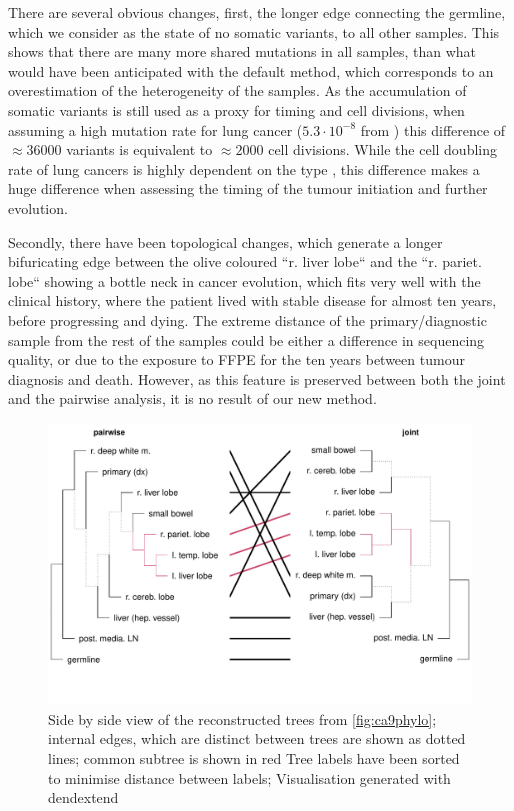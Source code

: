 
There are several obvious changes, first, the longer edge connecting the germline, which we consider as the state of no somatic variants, to all other samples. This shows that there are many more shared mutations in all samples, than what would have been anticipated with the default method, which corresponds to an overestimation of the heterogeneity of the samples. As the accumulation of somatic variants is still used as a proxy for timing and cell divisions, when assuming a high mutation rate for lung cancer ($5.3 \cdot 10^{-8}$ from \citeauthor*{Werner2020} \cite{Werner2020}) this difference of $\approx 36000$ variants is equivalent to $\approx 2000$ cell divisions. While the cell doubling rate of lung cancers is highly dependent on the type \cite{Arai1994}, this difference makes a huge difference when assessing the timing of the tumour initiation and further evolution. 

Secondly, there have been topological changes, which generate a longer bifuricating edge between the olive coloured ``r. liver lobe`` and the ``r. pariet. lobe`` showing a bottle neck in cancer evolution, which fits very well with the clinical history, where the patient lived with stable disease for almost ten years, before progressing and dying. The extreme distance of the primary/diagnostic sample from the rest of the samples could be either a difference in sequencing quality, or due to the exposure to FFPE for the ten years between tumour diagnosis and death. However, as this feature is preserved between both the joint and the pairwise analysis, it is no result of our new method.

\begin{figure}[!ht]
\centering
\includegraphics[width=.99\linewidth]{Figures/tanglePhyloCA9.pdf}
\caption[Tanglegram of the reconstructed phylogenies]{Side by side view of the reconstructed trees from \autoref{fig:ca9phylo}; internal edges, which are distinct between trees are shown as dotted lines; common subtree is shown in red  Tree labels have been sorted to minimise distance between labels; Visualisation generated with dendextend \cite{Galili2015}}\label{fig:tanglePhyloCA9}
\end{figure}

